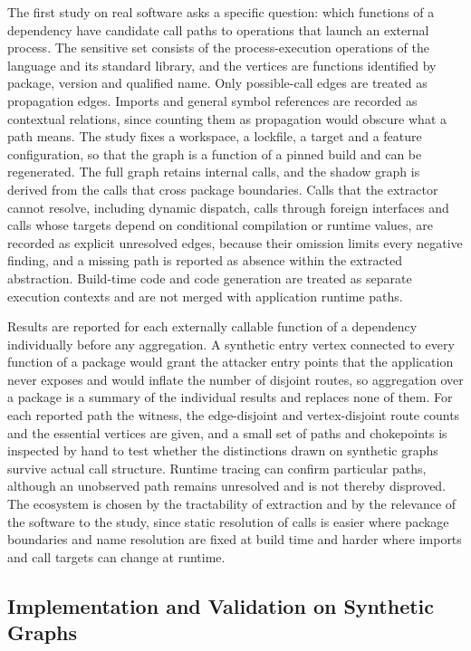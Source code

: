 \documentclass[11pt]{article}
\begin{document}
The first study on real software asks a specific question: which functions of a dependency have candidate call paths to operations that launch an external process. The sensitive set consists of the process-execution operations of the language and its standard library, and the vertices are functions identified by package, version and qualified name. Only possible-call edges are treated as propagation edges. Imports and general symbol references are recorded as contextual relations, since counting them as propagation would obscure what a path means. The study fixes a workspace, a lockfile, a target and a feature configuration, so that the graph is a function of a pinned build and can be regenerated. The full graph retains internal calls, and the shadow graph is derived from the calls that cross package boundaries. Calls that the extractor cannot resolve, including dynamic dispatch, calls through foreign interfaces and calls whose targets depend on conditional compilation or runtime values, are recorded as explicit unresolved edges, because their omission limits every negative finding, and a missing path is reported as absence within the extracted abstraction. Build-time code and code generation are treated as separate execution contexts and are not merged with application runtime paths.

Results are reported for each externally callable function of a dependency individually before any aggregation. A synthetic entry vertex connected to every function of a package would grant the attacker entry points that the application never exposes and would inflate the number of disjoint routes, so aggregation over a package is a summary of the individual results and replaces none of them. For each reported path the witness, the edge-disjoint and vertex-disjoint route counts and the essential vertices are given, and a small set of paths and chokepoints is inspected by hand to test whether the distinctions drawn on synthetic graphs survive actual call structure. Runtime tracing can confirm particular paths, although an unobserved path remains unresolved and is not thereby disproved. The ecosystem is chosen by the tractability of extraction and by the relevance of the software to the study, since static resolution of calls is easier where package boundaries and name resolution are fixed at build time and harder where imports and call targets can change at runtime.

\subsection{Implementation and Validation on Synthetic Graphs}
\end{document}
